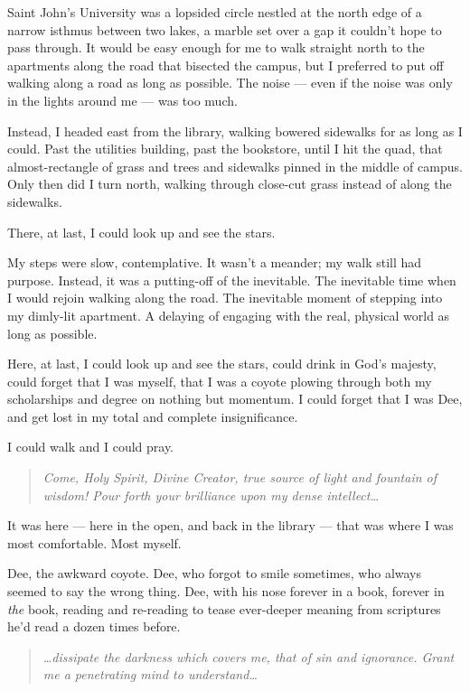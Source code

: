 Saint John's University was a lopsided circle nestled at the north edge of a narrow isthmus between two lakes, a marble set over a gap it couldn't hope to pass through. It would be easy enough for me to walk straight north to the apartments along the road that bisected the campus, but I preferred to put off walking along a road as long as possible. The noise --- even if the noise was only in the lights around me --- was too much.

Instead, I headed east from the library, walking bowered sidewalks for as long as I could. Past the utilities building, past the bookstore, until I hit the quad, that almost-rectangle of grass and trees and sidewalks pinned in the middle of campus. Only then did I turn north, walking through close-cut grass instead of along the sidewalks.

There, at last, I could look up and see the stars.

My steps were slow, contemplative. It wasn't a meander; my walk still had purpose. Instead, it was a putting-off of the inevitable. The inevitable time when I would rejoin walking along the road. The inevitable moment of stepping into my dimly-lit apartment. A delaying of engaging with the real, physical world as long as possible.

Here, at last, I could look up and see the stars, could drink in God's majesty, could forget that I was myself, that I was a coyote plowing through both my scholarships and degree on nothing but momentum. I could forget that I was Dee, and get lost in my total and complete insignificance.

I could walk and I could pray.

\begin{quote}
\emph{Come, Holy Spirit, Divine Creator, true source of light and fountain of wisdom! Pour forth your brilliance upon my dense intellect\ldots{}}
\end{quote}

It was here --- here in the open, and back in the library --- that was where I was most comfortable. Most myself.

Dee, the awkward coyote. Dee, who forgot to smile sometimes, who always seemed to say the wrong thing. Dee, with his nose forever in a book, forever in \emph{the} book, reading and re-reading to tease ever-deeper meaning from scriptures he'd read a dozen times before.

\begin{quote}
\emph{\ldots dissipate the darkness which covers me, that of sin and ignorance. Grant me a penetrating mind to understand\ldots{}}
\end{quote}

